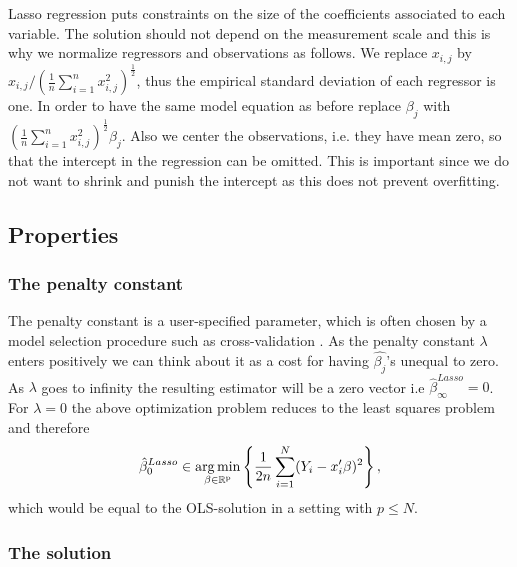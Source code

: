 \documentclass{article}
\theoremstyle{definition}
\DeclareMathOperator*{\argmin}{arg\,min}
\begin{document}
Lasso regression puts constraints on the size of the coefficients associated to each variable. The solution should not depend on the measurement scale and this is why we normalize regressors and observations as follows. We replace $x_{i,j}$ by $x_{i,j}/ (\frac{1}{n} \sum_{i=1}^{n} x_{i,j}^2)^\frac{1}{2}$, thus the empirical standard deviation of each regressor is one. In order to have the same model equation as before replace $\beta_j$ with $(\frac{1}{n}\sum_{i=1}^{n} x_{i,j}^2)^\frac{1}{2} \beta_j$. Also we center the observations, i.e. they have mean zero, so that the intercept in the regression can be omitted. This is important since we do not want to shrink and punish the intercept as this does not prevent overfitting.


\subsection{Properties}

\subsubsection{The penalty constant}

The penalty constant is a user-specified parameter, which is often chosen by a model selection procedure such as cross-validation \citep{sparsity}.
As the penalty constant $\lambda$ enters positively we can think about it as a cost for having $\hat{\beta_j}$'s unequal to zero. As $\lambda$ goes to infinity the resulting estimator will be a zero vector i.e $\hat{\beta}_{\infty}^{Lasso}=0$. For $\lambda=0$ the above optimization problem reduces to the least squares problem and therefore 
\begin{equation}
	\hat{\beta}_{0}^{Lasso}\in\argmin_{\beta \in\rm \mathbb{R}^p} \left  \{ \frac{1}{2n}  \sum_{i=1}^{N}(Y_{i}-x_{i}'\beta)^2\right \},
\end{equation}
which would be equal to the OLS-solution in a setting with $p\leq N$.

\subsubsection{The solution}
\end{document}
